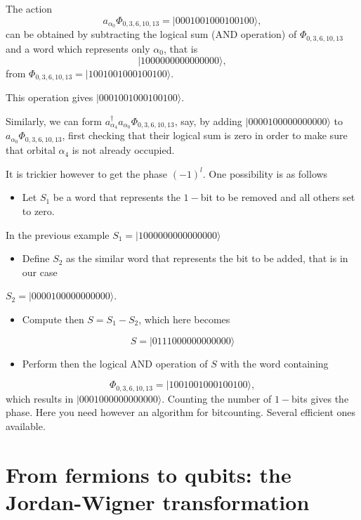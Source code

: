 The action
\[
a_{\alpha_0}\Phi_{0,3,6,10,13} = |0001001000100100\rangle,
\]
can be obtained by subtracting the logical sum (AND operation) of $\Phi_{0,3,6,10,13}$ and 
a word which represents only $\alpha_0$, that is
\[
|1000000000000000\rangle,
\] 
from $\Phi_{0,3,6,10,13}= |1001001000100100\rangle$.

This operation gives $|0001001000100100\rangle$. 

Similarly, we can form $a^{\dagger}_{\alpha_4}a_{\alpha_0}\Phi_{0,3,6,10,13}$, say, by adding 
$|0000100000000000\rangle$ to $a_{\alpha_0}\Phi_{0,3,6,10,13}$, first checking that their logical sum
is zero in order to make sure that orbital $\alpha_4$ is not already occupied. 

It is trickier however to get the phase $(-1)^l$. 
One possibility is as follows
\begin{itemize}
\item Let $S_1$ be a word that represents the $1-$bit to be removed and all others set to zero.
\end{itemize}

\noindent
In the previous example $S_1=|1000000000000000\rangle$
\begin{itemize}
\item Define $S_2$ as the similar word that represents the bit to be added, that is in our case
\end{itemize}

\noindent
$S_2=|0000100000000000\rangle$.
\begin{itemize}
\item Compute then $S=S_1-S_2$, which here becomes
\end{itemize}

\noindent
\[
S=|0111000000000000\rangle
\]
\begin{itemize}
\item Perform then the logical AND operation of $S$ with the word containing 
\end{itemize}

\noindent
\[
\Phi_{0,3,6,10,13} = |1001001000100100\rangle,
\]
which results in $|0001000000000000\rangle$. Counting the number of $1-$bits gives the phase.  Here you need however an algorithm for bitcounting. Several efficient ones available. 


\section{From fermions to qubits: the Jordan-Wigner transformation}
\label{sec:jordanwigner}

